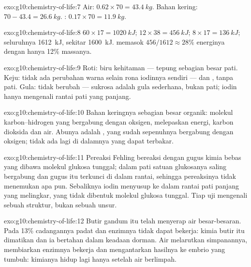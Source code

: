 \begin{solution}{exo:g10:chemistry-of-life:7}
Air: $0.62 \times 70 = \qty{43.4}{kg}$. Bahan kering: $70 - 43.4 =
\qty{26.6}{kg}$. : $0.17 \times 70 = \qty{11.9}{kg}$.
\end{solution}

\begin{solution}{exo:g10:chemistry-of-life:8}
 $60 \times 17 = \qty{1020}{kJ}$;  $12 \times 38 =
\qty{456}{kJ}$;  $8 \times 17 = \qty{136}{kJ}$; seluruhnya
\qty{1612}{kJ}, sekitar \qty{1600}{kJ}.  memasok $456/1612 \approx
28\%$ energinya dengan hanya 12\% massanya.
\end{solution}

\begin{solution}{exo:g10:chemistry-of-life:9}
Roti: biru kehitaman --- tepung sebagian besar pati. Keju: tidak ada
perubahan warna selain rona iodinnya sendiri ---  dan , tanpa pati. Gula:
tidak berubah --- sukrosa adalah gula sederhana, bukan pati; iodin
hanya mengenali rantai pati yang panjang.
\end{solution}

\begin{solution}{exo:g10:chemistry-of-life:10}
Bahan keringnya sebagian besar organik: molekul karbon--hidrogen yang
bergabung dengan oksigen, melepaskan energi, karbon dioksida dan air.
Abunya adalah , yang sudah sepenuhnya bergabung dengan
oksigen; tidak ada lagi di dalamnya yang dapat terbakar.
\end{solution}

\begin{solution}{exo:g10:chemistry-of-life:11}
Pereaksi Fehling bereaksi dengan gugus kimia bebas yang dibawa molekul
glukosa tunggal; dalam pati satuan glukosanya saling bergabung dan
gugus itu terkunci di dalam rantai, sehingga pereaksinya tidak
menemukan apa pun. Sebaliknya iodin menyusup ke dalam rantai pati
panjang yang melingkar, yang tidak dibentuk molekul glukosa tunggal.
Tiap uji mengenali sebuah struktur, bukan sebuah unsur.
\end{solution}

\begin{solution}{exo:g10:chemistry-of-life:12}
Butir gandum itu telah menyerap air besar-besaran. Pada 13\%
cadangannya padat dan enzimnya tidak dapat bekerja: kimia butir itu
dimatikan dan ia bertahan dalam keadaan dorman. Air melarutkan
simpanannya, membiarkan enzimnya bekerja dan mengantarkan hasilnya ke
embrio yang tumbuh: kimianya hidup lagi hanya setelah air berlimpah.
\end{solution}

